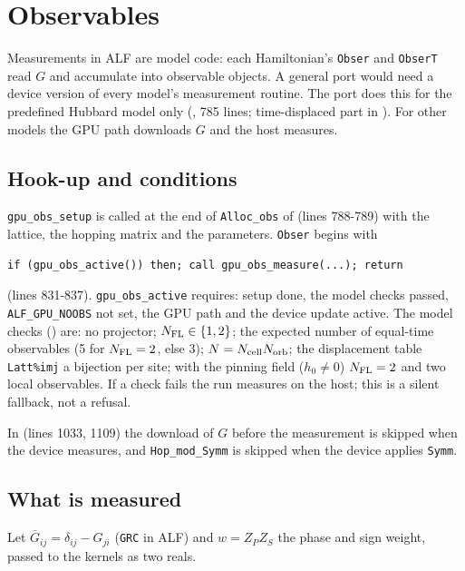 \section{Observables}
\label{sec:obs}

Measurements in ALF are model code: each Hamiltonian's \texttt{Obser} and \texttt{ObserT} read $G$ and accumulate into observable objects. A general port would need a device version of every model's measurement routine. The port does this for the predefined Hubbard model only (, 785 lines; time-displaced part in ). For other models the GPU path downloads $G$ and the host measures.

\subsection{Hook-up and conditions}

\texttt{gpu\_obs\_setup} is called at the end of \texttt{Alloc\_obs} of  (lines 788-789) with the lattice, the hopping matrix and the parameters. \texttt{Obser} begins with
\begin{lstlisting}
if (gpu_obs_active()) then; call gpu_obs_measure(...); return
\end{lstlisting}
(lines 831-837). \texttt{gpu\_obs\_active} requires: setup done, the model checks passed, \texttt{ALF\_GPU\_NOOBS} not set, the GPU path and the device update active. The model checks () are: no projector; $N_{\rm FL}\in\{1,2\}$; the expected number of equal-time observables (5 for $N_{\rm FL}=2$, else 3); $N=N_{\rm cell}N_{\rm orb}$; the displacement table \texttt{Latt\%imj} a bijection per site; with the pinning field ($h_0\ne0$) $N_{\rm FL}=2$ and two local observables. If a check fails the run measures on the host; this is a silent fallback, not a refusal.

In  (lines 1033, 1109) the download of $G$ before the measurement is skipped when the device measures, and \texttt{Hop\_mod\_Symm} is skipped when the device applies \texttt{Symm}.

\subsection{What is measured}

Let $\bar G_{ij}=\delta_{ij}-G_{ji}$ (\texttt{GRC} in ALF) and $w=Z_PZ_S$ the phase and sign weight, passed to the kernels as two reals.

